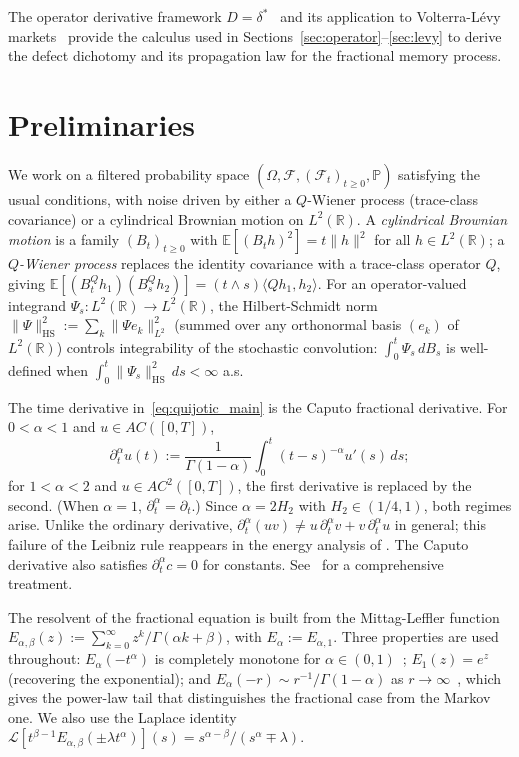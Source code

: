 \documentclass[11pt]{article}
\theoremstyle{definition}
\theoremstyle{remark}
\newcommand{\E}{\mathbb{E}}
\newcommand{\R}{\mathbb{R}}
\newcommand{\FF}{\mathcal{F}}
\newcommand{\ip}[2]{\langle #1, #2 \rangle}
\newcommand{\norm}[1]{\| #1 \|}
\begin{document}
The operator derivative framework
$D = \delta^*$~\cite{fontes2026opfac,fontes2026banach}
and its application to Volterra-L\'evy
markets~\cite{fontes2026volterra} provide the calculus
used in Sections~\ref{sec:operator}--\ref{sec:levy}
to derive the defect dichotomy and its propagation law
for the fractional memory process.

\section{Preliminaries}\label{sec:prelim}

We work on a filtered probability space
$(\Omega, \FF, (\FF_t)_{t \geq 0}, \mathbb{P})$
satisfying the usual conditions, with noise driven by
either a $Q$-Wiener process (trace-class covariance)
or a cylindrical Brownian motion on $L^2(\R)$.
A \emph{cylindrical Brownian motion} is a family
$(B_t)_{t \geq 0}$ with
$\E[(B_t h)^2] = t\norm{h}^2$ for all
$h \in L^2(\R)$; a \emph{$Q$-Wiener process}
replaces the identity covariance with a trace-class
operator $Q$, giving
$\E[(B_t^Q h_1)(B_s^Q h_2)]
= (t \wedge s)\ip{Qh_1}{h_2}$.
For an operator-valued integrand
$\Psi_s : L^2(\R) \to L^2(\R)$, the Hilbert-Schmidt
norm
$\norm{\Psi}_{\mathrm{HS}}^2
:= \sum_k \norm{\Psi e_k}_{L^2}^2$
(summed over any orthonormal basis $(e_k)$ of
$L^2(\R)$) controls integrability of the stochastic
convolution:
$\int_0^t \Psi_s\, dB_s$ is well-defined when
$\int_0^t \norm{\Psi_s}_{\mathrm{HS}}^2\, ds < \infty$
a.s.

The time derivative in~\eqref{eq:quijotic_main} is
the Caputo fractional derivative.  For
$0 < \alpha < 1$ and $u \in AC([0,T])$,
\begin{equation}\label{eq:caputo}
\partial_t^\alpha u(t)
:= \frac{1}{\Gamma(1-\alpha)}
\int_0^t (t-s)^{-\alpha} u'(s)\, ds;
\end{equation}
for $1 < \alpha < 2$ and $u \in AC^2([0,T])$,
the first derivative is replaced by the second.
(When $\alpha = 1$, $\partial_t^\alpha = \partial_t$.)
Since $\alpha = 2H_2$ with $H_2 \in (1/4,1)$,
both regimes arise.
Unlike the ordinary derivative,
$\partial_t^\alpha(uv) \neq
u\,\partial_t^\alpha v + v\,\partial_t^\alpha u$
in general; this failure of the Leibniz rule
reappears in the energy analysis of
.  The Caputo derivative also
satisfies $\partial_t^\alpha c = 0$ for constants.
See~\cite{podlubny1999} for a comprehensive
treatment.

The resolvent of the fractional equation is built
from the Mittag-Leffler function
$E_{\alpha,\beta}(z)
:= \sum_{k=0}^\infty z^k/\Gamma(\alpha k + \beta)$,
with $E_\alpha := E_{\alpha,1}$.  Three properties
are used throughout:
$E_\alpha(-t^\alpha)$ is completely monotone for
$\alpha \in (0,1)$~\cite{pollard1948};
$E_1(z) = e^z$ (recovering the exponential);
and $E_\alpha(-r) \sim r^{-1}/\Gamma(1-\alpha)$
as $r \to \infty$~\cite{gorenflo2014}, which gives
the power-law tail that distinguishes the fractional
case from the Markov one.  We also use the Laplace
identity
$\mathcal{L}[t^{\beta-1}
E_{\alpha,\beta}(\pm\lambda t^\alpha)](s)
= s^{\alpha-\beta}/(s^\alpha \mp \lambda)$.
\end{document}

